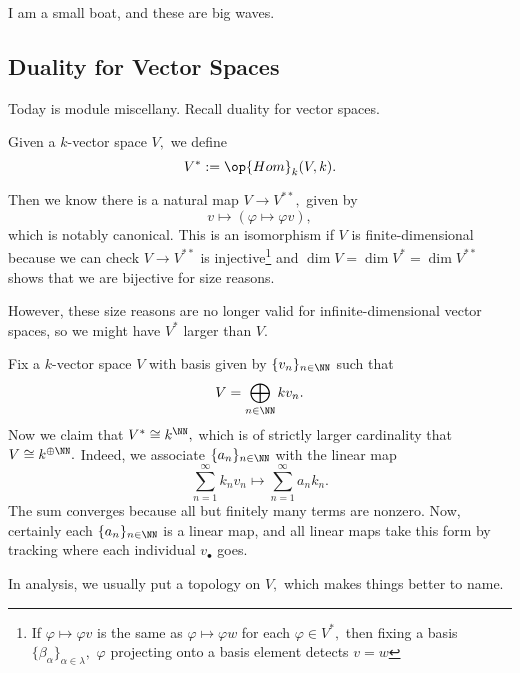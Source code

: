 












I am a small boat, and these are big waves.

\subsection{Duality for Vector Spaces}
Today is module miscellany. Recall duality for vector spaces.
\begin{definition}
	Given a $k$-vector space $V,$ we define
	\[V^*:=\op{Hom}_k(V,k).\]
\end{definition}
Then we know there is a natural map $V\to V^{**},$ given by
\[v\mapsto(\varphi\mapsto\varphi v),\]
which is notably canonical. This is an isomorphism if $V$ is finite-dimensional because we can check $V\to V^{**}$ is injective\footnote{If $\varphi\mapsto\varphi v$ is the same as $\varphi\mapsto\varphi w$ for each $\varphi\in V^*,$ then fixing a basis $\{\beta_\alpha\}_{\alpha\in\lambda},$ $\varphi$ projecting onto a basis element detects $v=w$} and $\dim V=\dim V^*=\dim V^{**}$ shows that we are bijective for size reasons.

However, these size reasons are no longer valid for infinite-dimensional vector spaces, so we might have $V^*$ larger than $V.$
\begin{nex}
	Fix a $k$-vector space $V$ with basis given by $\{v_n\}_{n\in\NN}$ such that
	\[V=\bigoplus_{n\in\NN}kv_n.\]
	Now we claim that $V^*\cong k^\NN,$ which is of strictly larger cardinality that $V\cong k^{\oplus\NN}.$ Indeed, we associate $\{a_n\}_{n\in\NN}$ with the linear map
	\[\sum_{n=1}^\infty k_nv_n\mapsto\sum_{n=1}^\infty a_nk_n.\]
	The sum converges because all but finitely many terms are nonzero. Now, certainly each $\{a_n\}_{n\in\NN}$ is a linear map, and all linear maps take this form by tracking where each individual $v_\bullet$ goes.
\end{nex}
In analysis, we usually put a topology on $V,$ which makes things better to name.

